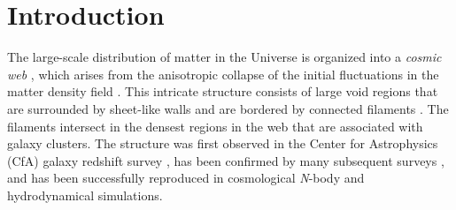\documentclass{aa}
\begin{document}
\section{Introduction}
The large-scale distribution of matter in the Universe is organized into a {\it \textup{cosmic web}} \citep{Bond1996}, which arises from the anisotropic collapse of the initial fluctuations in the matter density field \citep{Zeldovich1970}. This intricate structure consists of large void regions that are surrounded by sheet-like walls and are bordered by connected filaments \citep[e.g.][]{Springel2006}. The filaments intersect in the densest regions in the web that are associated with galaxy clusters. The structure was first observed in the Center for Astrophysics (CfA) galaxy redshift survey \citep{Lapparent1986}, has been confirmed by many subsequent surveys \citep[e.g.][]{Geller1989,Colless2001,Tegmark2004,Cole2005}, and has been successfully reproduced in cosmological {\it N}-body and hydrodynamical simulations. 
\end{document}

